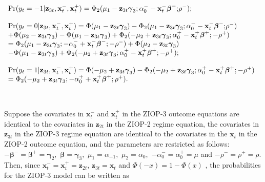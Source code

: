 \documentclass[letterpaper,fleqn,12pt]{article}
\begin{document}
$%
\begin{array}{l}
\Pr (y_{t}=-1|\mathbf{z}_{3t},\mathbf{x}_{t}^{-},\mathbf{x}_{t}^{+})=\Phi
_{2}(\mu _{1}-\mathbf{z}_{3t}\mathbf{\gamma }_{3};\alpha _{0}^{-}-\mathbf{x}%
_{t}^{-}\mathbf{\beta }^{-}\mathbf{;}\rho ^{-}); \\ 
\\ 
\Pr (y_{t}=0|\mathbf{z}_{3t},\mathbf{x}_{t}^{-},\mathbf{x}_{t}^{+})=\Phi
(\mu _{1}-\mathbf{z}_{3t}\mathbf{\gamma }_{3})-\Phi _{2}(\mu _{1}-\mathbf{z}%
_{3t}\mathbf{\gamma }_{3};\alpha _{0}^{-}-\mathbf{x}_{t}^{-}\mathbf{\beta }%
^{-}\mathbf{;}\rho ^{-}) \\ 
+\Phi (\mu _{2}-\mathbf{z}_{3t}\mathbf{\gamma }_{3})-\Phi (\mu _{1}-\mathbf{z%
}_{3t}\mathbf{\gamma }_{3})+\Phi _{2}(-\mu _{2}+\mathbf{z}_{3t}\mathbf{%
\gamma }_{3};\alpha _{0}^{+}-\mathbf{x}_{t}^{+}\mathbf{\beta }^{+};\mathbf{-}%
\rho ^{+}) \\ 
=\Phi _{2}(\mu _{1}-\mathbf{z}_{3t}\mathbf{\gamma }_{3};-\alpha _{0}^{-}+%
\mathbf{x}_{t}^{-}\mathbf{\beta }^{-}\mathbf{;-}\rho ^{-})+\Phi (\mu _{2}-%
\mathbf{z}_{3t}\mathbf{\gamma }_{3}) \\ 
-\Phi (\mu _{1}-\mathbf{z}_{3t}\mathbf{\gamma }_{3})+\Phi _{2}(-\mu _{2}+%
\mathbf{z}_{3t}\mathbf{\gamma }_{3};\alpha _{0}^{+}-\mathbf{x}_{t}^{+}%
\mathbf{\beta }^{+};\mathbf{-}\rho ^{+}); \\ 
\\ 
\Pr (y_{t}=1|\mathbf{z}_{3t},\mathbf{x}_{t}^{-},\mathbf{x}_{t}^{+})=\Phi
(-\mu _{2}+\mathbf{z}_{3t}\mathbf{\gamma }_{3})-\Phi _{2}(-\mu _{2}+\mathbf{z%
}_{3t}\mathbf{\gamma }_{3};\alpha _{0}^{+}-\mathbf{x}_{t}^{+}\mathbf{\beta }%
^{+};\mathbf{-}\rho ^{+}) \\ 
=\Phi _{2}(-\mu _{2}+\mathbf{z}_{3t}\mathbf{\gamma }_{3};-\alpha _{0}^{+}+%
\mathbf{x}_{t}^{+}\mathbf{\beta }^{+};\rho ^{+}). \\ 
\bigskip%
\end{array}%
$

Suppose the covariates in $\mathbf{x}_{t}^{-}$ and $\mathbf{x}_{t}^{+}$ in
the ZIOP-3 outcome equations are identical to the covariates in $\mathbf{z}%
_{2t}$ in the ZIOP-2 regime equation, the covariates in $\mathbf{z}_{3t}$ in
the ZIOP-3 regime equation are identical to the covariates in the $\mathbf{x}%
_{t}$ in the ZIOP-2 outcome equation, and the parameters are restricted as
follows: $-\mathbf{\beta }^{-}=\mathbf{\beta }^{+}=\mathbf{\gamma }_{2},$ $%
\mathbf{\beta }=\mathbf{\gamma }_{3},$ $\mu _{1}=\alpha _{-1},$ $\mu
_{2}=\alpha _{0},$ $-\alpha _{0}^{-}=\alpha _{0}^{+}=\mu $ and $-\rho
^{-}=\rho ^{+}=\rho $. Then, since $\mathbf{x}_{t}^{-}=\mathbf{x}_{t}^{+}=%
\mathbf{z}_{2t}$, $\mathbf{z}_{3t}=\mathbf{x}_{t}$ and $\Phi (-x)=1-\Phi (x)$%
, the probabilities for the ZIOP-3 model can be written as
\end{document}
